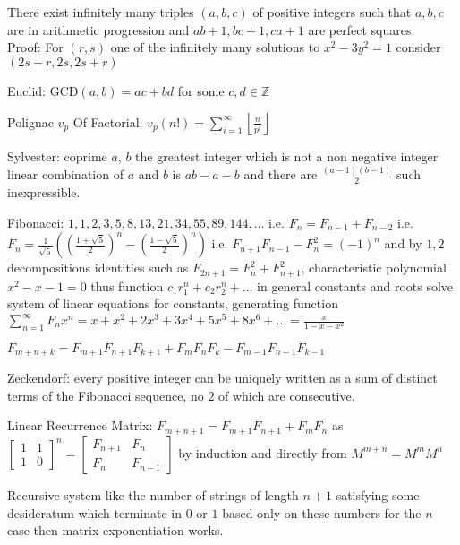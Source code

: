 There exist infinitely many triples $(a,b,c)$ of positive integers such that $a,b,c$ are in arithmetic progression and $ab+1,bc+1,ca+1$ are perfect squares. \\
Proof: For $(r,s)$ one of the infinitely many solutions to $x^2-3y^2=1$ consider $(2s-r,2s,2s+r)$

Euclid: $\text{GCD}(a,b)=ac+bd$ for some $c,d \in \mathbb{Z}$

Polignac $v_p$ Of Factorial: $v_p (n!)=\sum_{i=1}^{\infty} \left\lfloor \frac{n}{p^i} \right\rfloor$

Sylvester: coprime $a$, $b$ the greatest integer which is not a non negative integer linear combination of $a$ and $b$ is $ab-a-b$ and there are $\frac{(a-1)(b-1)}{2}$ such inexpressible.

Fibonacci: $1,1,2,3,5,8,13,21,34,55,89,144,\dots$ i.e. $F_n=F_{n-1}+F_{n-2}$ i.e. $F_n = \frac{1}{\sqrt{5}} \left(\left(\frac{1+\sqrt{5}}{2} \right)^n - \left(\frac{1-\sqrt{5}}{2} \right)^n \right)$ i.e. $F_{n+1} F_{n-1} - F_n^2=(-1)^n$ and by $1,2$ decompositions identities such as $F_{2n+1}=F_{n}^2+F_{n+1}^2$, characteristic polynomial $x^2-x-1=0$ thus function $c_1 r_1^n + c_2 r_2^n + \dots$ in general constants and roots solve system of linear equations for constants, generating function $\sum_{n=1}^{\infty} F_n x^n = x+x^2+2 x^3+3 x^4+5 x^5+8 x^6+\dots = \frac{x}{1-x-x^2}$

$F_{m+n+k}=F_{m+1}F_{n+1}F_{k+1}+F_{m}F_{n}F_{k}-F_{m-1}F_{n-1}F_{k-1}$

Zeckendorf: every positive integer can be uniquely written as a sum of distinct terms of the Fibonacci sequence, no $2$ of which are consecutive.

Linear Recurrence Matrix: $F_{m+n+1}=F_{m+1}F_{n+1}+F_{m}F_{n}$ as $\begin{bmatrix} 1 & 1 \\ 1 & 0 \end{bmatrix}^n = \begin{bmatrix} F_{n+1} & F_n \\ F_n & F_{n-1} \end{bmatrix}$ by induction and directly from $M^{m+n}=M^m M^n$

Recursive system like the number of strings of length $n+1$ satisfying some desideratum which terminate in $0$ or $1$ based only on these numbers for the $n$ case then matrix exponentiation works.

